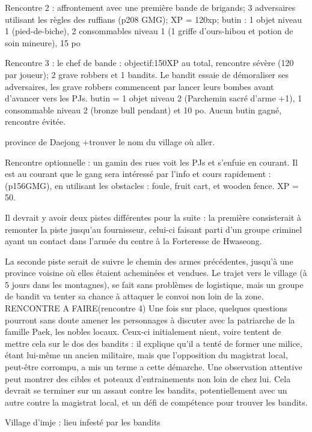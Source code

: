\documentclass[10pt,a4paper]{book}
\begin{document}
Rencontre 2 : affrontement avec une première bande de brigands; 3 adversaires utilisant les règles des ruffians (p208 GMG); XP = 120xp; butin : 1 objet niveau 1 (pied-de-biche), 2 consommables niveau 1 (1 griffe d'ours-hibou et potion de soin mineure), 15 po

Rencontre 3 : le chef de bande : objectif:150XP au total, rencontre sévère (120 par joueur); 2 grave robbers et 1 bandits. Le bandit essaie de démoraliser ses adversaires, les grave robbers commencent par lancer leurs bombes avant d'avancer vers les PJs. butin = 1 objet niveau 2 (Parchemin sacré d'arme +1), 1 consommable niveau 2 (bronze bull pendant) et 10 po. Aucun butin gagné, rencontre évitée.

province de Daejong +trouver le nom du village où aller.

Rencontre optionnelle : un gamin des rues voit les PJs et s'enfuie en courant. Il est au courant que le gang sera intéressé par l'info et cours rapidement : (p156GMG), en utilisant les obstacles : foule, fruit cart, et wooden fence. XP = 50.

Il devrait y avoir deux pistes différentes pour la suite : la première consisterait à remonter la piste jusqu'au fournisseur, celui-ci faisant parti d'un groupe criminel ayant un contact dans l'armée du centre à la Forteresse de Hwaseong.

La seconde piste serait de suivre le chemin des armes précédentes, jusqu'à une province voisine où elles étaient acheminées et vendues. Le trajet vers le village (à 5 jours dans les montagnes), se fait sans problèmes de logistique, mais un groupe de bandit va tenter sa chance à attaquer le convoi non loin de la zone. RENCONTRE A FAIRE(rencontre 4) Une fois sur place, quelques questions pourront sans doute amener les personnages à discuter avec la patriarche de la famille Paek, les nobles locaux. Ceux-ci initialement nient, voire tentent de mettre cela sur le dos des bandits : il explique qu'il a tenté de former une milice, étant lui-même un ancien militaire, mais que l'opposition du magistrat local, peut-être corrompu, a mis un terme a cette démarche. Une observation attentive peut montrer des cibles et poteaux d'entrainements non loin de chez lui. Cela devrait se terminer sur un assaut contre les bandits, potentiellement avec un autre contre la magistrat local, et un défi de compétence pour trouver les bandits.

Village d'imje : lieu infesté par les bandits
\end{document}
